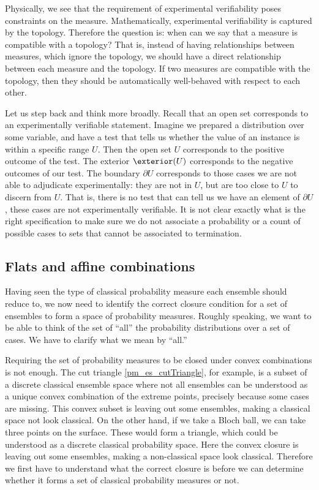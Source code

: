 Physically, we see that the requirement of experimental verifiability poses constraints on the measure. Mathematically, experimental verifiability is captured by the topology. Therefore the question is: when can we say that a measure is compatible with a topology? That is, instead of having relationships between measures, which ignore the topology, we should have a direct relationship between each measure and the topology. If two measures are compatible with the topology, then they should be automatically well-behaved with respect to each other.

Let us step back and think more broadly. Recall that an open set corresponds to an experimentally verifiable statement. Imagine we prepared a distribution over some variable, and have a test that tells us whether the value of an instance is within a specific range $U$. Then the open set $U$ corresponds to the positive outcome of the test. The exterior $\exterior(U)$ corresponds to the negative outcomes of our test. The boundary $\partial U$ corresponds to those cases we are not able to adjudicate experimentally: they are not in $U$, but are too close to $U$ to discern from $U$. That is, there is no test that can tell us we have an element of $\partial U$, these cases are not experimentally verifiable. It is not clear exactly what is the right specification to make sure we do not associate a probability or a count of possible cases to sets that cannot be associated to termination.

\subsection{Flats and affine combinations}

Having seen the type of classical probability measure each ensemble should reduce to, we now need to identify the correct closure condition for a set of ensembles to form a space of probability measures. Roughly speaking, we want to be able to think of the set of ``all'' the probability distributions over a set of cases. We have to clarify what we mean by ``all.''

Requiring the set of probability measures to be closed under convex combinations is not enough. The cut triangle \ref{pm_es_cutTriangle}, for example, is a subset of a discrete classical ensemble space where not all ensembles can be understood as a unique convex combination of the extreme points, precisely because some cases are missing. This convex subset is leaving out some ensembles, making a classical space not look classical. On the other hand, if we take a Bloch ball, we can take three points on the surface. These would form a triangle, which could be understood as a discrete classical probability space. Here the convex closure is leaving out some ensembles, making a non-classical space look classical. Therefore we first have to understand what the correct closure is before we can determine whether it forms a set of classical probability measures or not.

